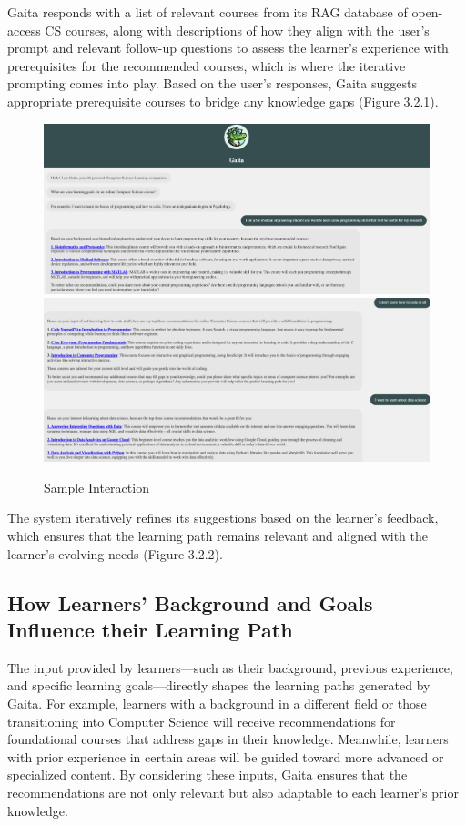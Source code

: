 Gaita responds with a list of relevant courses from its RAG database of open-access CS courses, along with descriptions of how they align with the user’s prompt and relevant follow-up questions to assess the learner's experience with prerequisites for the recommended courses, which is where the iterative prompting comes into play. Based on the user's responses, Gaita suggests appropriate prerequisite courses to bridge any knowledge gaps (Figure 3.2.1).

\begin{figure}
    \includegraphics[width=1\linewidth]{figures/ex1a.png}
    \includegraphics[width=1\linewidth]{figures/ex1b.png}
    \caption{Sample Interaction}
    \label{fig:hu}
\end{figure}



The system iteratively refines its suggestions based on the learner's feedback, which ensures that the learning path remains relevant and aligned with the learner's evolving needs (Figure 3.2.2).


\subsection{How Learners' Background and Goals Influence their Learning Path}

The input provided by learners—such as their background, previous experience, and specific learning goals—directly shapes the learning paths generated by Gaita. For example, learners with a background in a different field or those transitioning into Computer Science will receive recommendations for foundational courses that address gaps in their knowledge. Meanwhile, learners with prior experience in certain areas will be guided toward more advanced or specialized content. By considering these inputs, Gaita ensures that the recommendations are not only relevant but also adaptable to each learner's prior knowledge.

